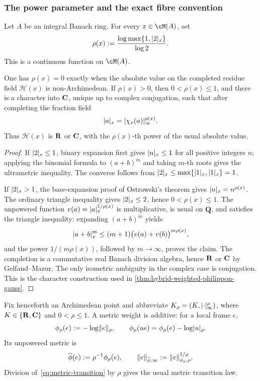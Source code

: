 \subsubsection{The power parameter and the exact fibre convention}

Let $A$ be an integral Banach ring.  For every $x\in\cM(A)$, set
\begin{equation}
 \rho(x):=\frac{\log\max\{1,\lvert2\rvert_x\}}{\log 2}.
\label{eq:rho-base}
\end{equation}
This is a continuous function on $\cM(A)$.

\begin{lemma}
\label{lem:rho-split}
One has $\rho(x)=0$ exactly when the absolute value on the completed residue
field $\mathcal H(x)$ is non-Archimedean.  If $\rho(x)>0$, then
$0<\rho(x)\leq1$, and there is a character into $\mathbf C$, unique up to complex
conjugation, such that after completing the fraction field
\begin{equation}
 \lvert a\rvert_x=\lvert\chi_x(a)\rvert_\infty^{\rho(x)}.
\label{eq:character-power}
\end{equation}
Thus $\mathcal H(x)$ is $\mathbf R$ or $\mathbf C$, with the
$\rho(x)$-th power of the usual absolute value.
\end{lemma}

\begin{proof}
If $\lvert2\rvert_x\leq1$, binary expansion first gives
$\lvert n\rvert_x\leq1$ for all positive integers $n$; applying the binomial
formula to $(a+b)^m$ and taking $m$-th roots gives the ultrametric
inequality.  The converse follows from
$\lvert2\rvert_x\leq\max\{\lvert1\rvert_x,\lvert1\rvert_x\}=1$.

If $\lvert2\rvert_x>1$, the base-expansion proof of Ostrowski's theorem gives
$\lvert n\rvert_x=n^{\rho(x)}$.  The ordinary triangle inequality gives
$\lvert2\rvert_x\leq2$, hence $0<\rho(x)\leq1$.  The unpowered function
$v(a)=\lvert a\rvert_x^{1/\rho(x)}$ is multiplicative, is usual on $\mathbf Q$,
and satisfies the triangle inequality: expanding $(a+b)^m$ yields
\[
 \lvert a+b\rvert_x^m\leq(m+1)
 \bigl(v(a)+v(b)\bigr)^{m\rho(x)},
\]
and the power $1/(m\rho(x))$, followed by $m\to\infty$, proves the
claim.  The completion is a commutative real Banach division algebra, hence
$\mathbf R$ or $\mathbf C$ by Gelfand--Mazur.  The only isometric ambiguity in the
complex case is conjugation.  This is the character construction used in
\cref{thm:hybrid-weighted-philippon-gauss}.
\end{proof}

Fix henceforth an Archimedean point and abbreviate
$K_\rho=(K,\lvert\cdot\rvert_\infty^\rho)$, where
$K\in\{\mathbf R,\mathbf C\}$ and $0<\rho\leq1$.  A metric weight is
additive: for a local frame $e$,
\begin{equation}
 \phi_\rho(e):=-\log\lVert e\rVert_\rho,
 \qquad
 \phi_\rho(ue)=\phi_\rho(e)-\log\lvert u\rvert_\rho.
\label{eq:metric-transition}
\end{equation}
Its unpowered metric is
\begin{equation}
 \overline\phi(e):=\rho^{-1}\phi_\rho(e),
 \qquad
 \lVert e\rVert_{\overline\phi,\infty}:=\lVert e\rVert_{\phi_\rho,\rho}^{1/\rho}.
\label{eq:metric-unpower}
\end{equation}
Division of~\eqref{eq:metric-transition} by $\rho$ gives the usual metric
transition law.

